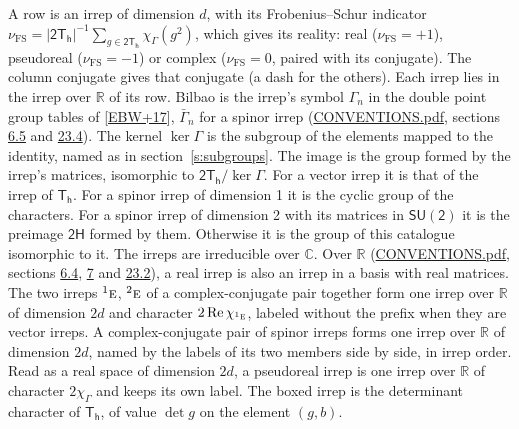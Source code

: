 \documentclass[10pt,a4paper]{article}
\numberwithin{equation}{section}
\newcommand{\grp}[1]{\mathsf{#1}}
\newcommand{\irr}[1]{\text{\normalfont\scshape #1}}
\newcommand{\conjpair}[1]{{}^{#1}}
\newcommand{\irchar}[1]{\chi_{#1}}
\newcommand{\fsind}{\nu_{\mathrm{FS}}}
\begin{document}
\leavevmode\label{n:index.frobenius}\label{n:head.irrep}\label{n:head.reality}A row is an irrep of dimension $d$, with its Frobenius--Schur indicator $\fsind = |\grp{2T_{h}}|^{-1}\allowbreak\sum_{g\in\grp{2T_{h}}}\irchar{\Gamma}(g^2)$, which gives its reality: real ($\fsind = +1$), pseudoreal ($\fsind = -1$) or complex ($\fsind = 0$, paired with its conjugate). \label{n:head.conjugate}The column conjugate gives that conjugate (a dash for the others). \label{n:head.over.real}Each irrep lies in the irrep over $\mathbb{R}$ of its row. \label{n:head.bilbao}\label{n:irrep.alias.gamma}Bilbao is the irrep's symbol $\Gamma_n$ in the double point group tables of [\href{../../../REFERENCES.pdf\#ref.EBW+17}{EBW+17}], $\bar{\Gamma}_n$ for a spinor irrep (\href{../../CONVENTIONS.pdf}{CONVENTIONS.pdf}, sections \href{../../../rotation/CONVENTIONS.pdf\#conv.6.5}{6.5} and \href{../../CONVENTIONS.pdf\#conv.23.4}{23.4}). \label{n:head.kernel}The kernel $\ker\Gamma$ is the subgroup of the elements mapped to the identity, named as in section~\ref{s:subgroups}. \label{n:head.image}The image is the group formed by the irrep's matrices, isomorphic to $\grp{2T_{h}}/\ker\Gamma$. For a vector irrep it is that of the irrep of \href{../../../rotation/data/pdf/Th.pdf}{$\grp{T_{h}}$}. For a spinor irrep of dimension 1 it is the cyclic group of the characters. For a spinor irrep of dimension 2 with its matrices in $\grp{SU(2)}$ it is the preimage $\grp{2H}$ formed by them. Otherwise it is the group of this catalogue isomorphic to it. The irreps are irreducible over $\mathbb{C}$. Over $\mathbb{R}$ (\href{../../CONVENTIONS.pdf}{CONVENTIONS.pdf}, sections \href{../../../rotation/CONVENTIONS.pdf\#conv.6.4}{6.4}, \href{../../../rotation/CONVENTIONS.pdf\#conv.7}{7} and \href{../../CONVENTIONS.pdf\#conv.23.2}{23.2}), a real irrep is also an irrep in a basis with real matrices. The two irreps $\conjpair{1}\irr{e}$, $\conjpair{2}\irr{e}$ of a complex-conjugate pair together form one irrep over $\mathbb{R}$ of dimension $2d$ and character $2\operatorname{Re}\irchar{\conjpair{1}\irr{e}}$, labeled without the prefix when they are vector irreps. A complex-conjugate pair of spinor irreps forms one irrep over $\mathbb{R}$ of dimension $2d$, named by the labels of its two members side by side, in irrep order. Read as a real space of dimension $2d$, a pseudoreal irrep is one irrep over $\mathbb{R}$ of character $2\irchar{\Gamma}$ and keeps its own label. \label{n:mark.determinant}The boxed irrep is the determinant character of \href{../../../rotation/data/pdf/Th.pdf}{$\grp{T_{h}}$}, of value $\det g$ on the element $(g, b)$.
\end{document}
